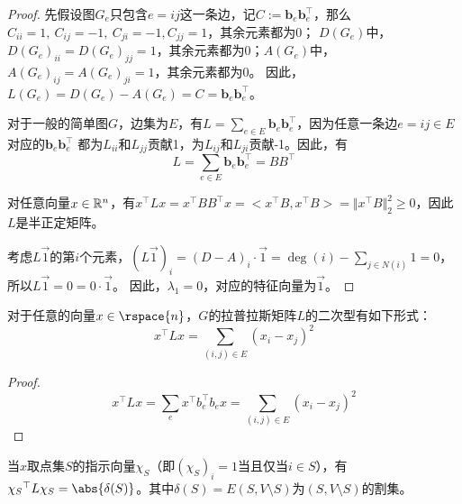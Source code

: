 \begin{proof}
    先假设图$G_e$只包含$e=ij$这一条边，记$C:=\mathbf{b}_e \mathbf{b}_e^\top$，那么$C_{ii}=1,\ C_{ij}=-1,\ C_{ji}=-1, C_{jj}=1$，其余元素都为0；
    $D(G_e)$中，$D(G_e)_{ii}=D(G_e)_{jj}=1$，其余元素都为0；$A(G_e)$中，$A(G_e)_{ij}=A(G_e)_{ji}=1$，其余元素都为0。
    因此，$L(G_e)=D(G_e)-A(G_e)=C=\mathbf{b}_e \mathbf{b}_e^\top$。

    对于一般的简单图$G$，边集为$E$，有$L=\sum_{e\in E}\mathbf{b}_e \mathbf{b}_e^\top$，因为任意一条边$e=ij\in E$对应的$\mathbf{b}_e \mathbf{b}_e^\top$
    都为$L_{ii}$和$L_{jj}$贡献1，为$L_{ij}$和$L_{ji}$贡献-1。因此，有
    \[
    L=\sum_{e\in E}\mathbf{b}_e \mathbf{b}_e^\top=BB^\top
    \]

    对任意向量$x\in \mathbb{R}^n$，有$x^\top Lx=x^\top BB^\top x=<x^\top B,x^\top B>=\Vert x^\top B\Vert_2^2\ge0$，因此$L$是半正定矩阵。

    考虑$L\vec{1}$的第$i$个元素，$(L\vec{1})_i=(D-A)_i\cdot\vec{1}=\deg(i)-\sum_{j\in N(i)}1=0$，所以$L\vec{1}=0=0\cdot\vec{1}$。
    因此，$\lambda_1=0$，对应的特征向量为$\vec{1}$。
\end{proof}

\begin{lemma}[拉普拉斯矩阵的二次型]
\label{lem:laplace_quardratic_form}
    对于任意的向量$x\in\rspace{n}$，$G$的拉普拉斯矩阵$L$的二次型有如下形式：
    \[x^{\top}Lx=\sum_{(i,j)\in E}(x_i-x_j)^2\]
\end{lemma}
\begin{proof}
    \[x^{\top}Lx=\sum_{e}x^{\top}b_e^{\top}b_ex=\sum_{(i,j)\in E}(x_i-x_j)^2\]
\end{proof}
当$x$取点集$S$的指示向量$\chi_S$（即$(\chi_S)_i=1$当且仅当$i\in S$），有$\qf{\chi_S}{L}=\abs{\delta(S)}$。其中$\delta(S)=E(S,V\setminus S)$为$(S,V\setminus S)$的割集。

